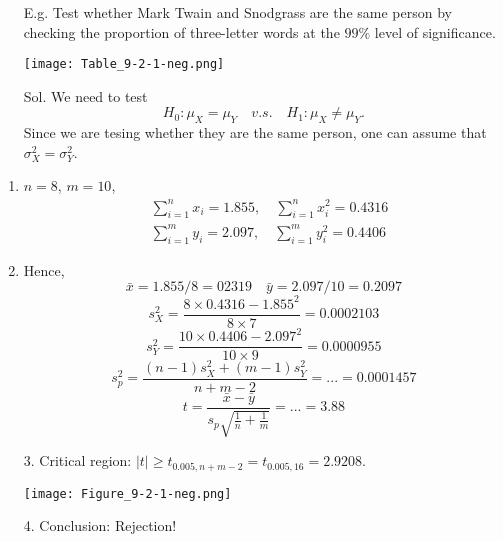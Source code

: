 \begin{frame}
\begin{itemize}
\item[E.g.] Test whether Mark Twain and Snodgrass are the same person by checking the proportion of three-letter words at the $99\%$ level of significance.
\begin{center}
\texttt{[image: Table\_9-2-1-neg.png]}
\end{center}
\vfill
\item[Sol.] We need to test
	\[
	H_0: \mu_X = \mu_Y \quad v.s. \quad H_1: \mu_X\ne \mu_Y.
	\]
	Since we are tesing whether they are the same person, one can assume that $\sigma_X^2 = \sigma_Y^2$.
\end{itemize}
\end{frame}
\begin{frame}
\begin{enumerate}
\item $n=8$, $m=10$,
\begin{align*}
&\sum_{i=1}^n x_i = 1.855,\quad \sum_{i=1}^n x_i^2 = 0.4316\\
&\sum_{i=1}^m y_i = 2.097,\quad \sum_{i=1}^m y_i^2 = 0.4406
\end{align*}
\vfill
\item Hence,
	\[
		\bar{x} = 1.855/8=02319 \quad \bar{y}=2.097/10 =0.2097
	\]
	\[
		s_X^2 =  \frac{8\times 0.4316-1.855^2}{8\times 7}=0.0002103
	\]
	\[
		s_Y^2 =  \frac{10\times 0.4406-2.097^2}{10\times 9}=0.0000955
	\]
	\[
		s_p^2 =  \frac{(n-1)s_X^2+(m-1)s_Y^2}{n+m-2} =...=0.0001457
	\]
	\[
		t=  \frac{\bar{x}-\bar{y}}{s_p\sqrt{ \frac{1}{n}+ \frac{1}{m} }} = ... = 3.88
	\]
\end{enumerate}
\end{frame}
\begin{frame}
	\begin{itemize}
		\item[3.] Critical region: $|t|\ge t_{0.005,n+m-2} = t_{0.005,16} = 2.9208$. \\[1em]
			\begin{center}
				\texttt{[image: Figure\_9-2-1-neg.png]}
			\end{center}
		 \vfill
		\item[4.] Conclusion: Rejection! \myEnd
	\end{itemize}
\end{frame}
